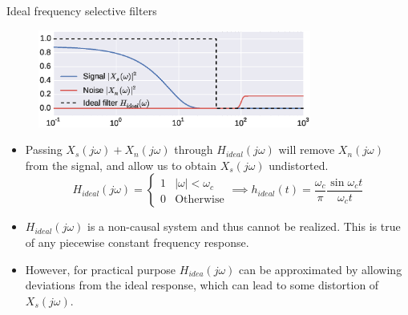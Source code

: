 \documentclass{beamer}
\begin{document}
\begin{frame}{Ideal frequency selective filters}
\begin{figure}
\centering
\includegraphics[width=0.8\textwidth]{img/sig_noise_ideal_filt.eps}
\end{figure}

\begin{small}
\begin{itemize}
\item Passing $X_s(j\omega) + X_n(j\omega)$ through $H_{ideal}\left(j\omega\right)$ will remove $X_n(j\omega)$ from the signal, and allow us to obtain $X_s(j\omega)$ undistorted.
\[ H_{ideal}(j\omega) = \begin{cases}
1 & |\omega| < \omega_c \\
0 & \text{Otherwise}
\end{cases} \implies h_{ideal}(t) =  \frac{\omega_c}{\pi}\frac{\sin \omega_c t}{\omega_c t}\]
\item $H_{ideal}(j\omega)$ is a non-causal system and thus cannot be realized. This is true of any piecewise constant frequency response.
\item However, for practical purpose $H_{idea}(j\omega)$ can be approximated by allowing deviations from the ideal response, which can lead to some distortion of $X_s(j\omega)$.
\end{itemize}
\end{small}
\end{frame}
\end{document}
